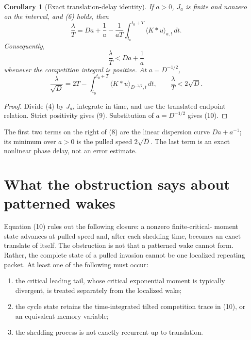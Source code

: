 \documentclass[11pt]{article}
\newtheorem{corollary}[theorem]{Corollary}
\begin{document}
\begin{corollary}[Exact translation-delay identity]\label{cor:delay}
If $a>0$, $J_a$ is finite and nonzero on the interval, and \emph{(6)} holds,
then
\begin{equation}
 \frac{\lambda}{T}
 =Da+\frac1a-\frac1{aT}
   \int_{t_0}^{t_0+T}\langle K*u\rangle_{a,t}\,dt.
\end{equation}
Consequently,
\begin{equation}
 \frac{\lambda}{T}<Da+\frac1a
\end{equation}
whenever the competition integral is positive.  At $a=D^{-1/2}$,
\begin{equation}
 \frac{\lambda}{\sqrt D}
 =2T-\int_{t_0}^{t_0+T}\langle K*u\rangle_{D^{-1/2},t}\,dt,
 \qquad \frac{\lambda}{T}<2\sqrt D.
\end{equation}
\end{corollary}

\begin{proof}
Divide (4) by $J_a$, integrate in time, and use the translated endpoint
relation.  Strict positivity gives (9).  Substitution of $a=D^{-1/2}$ gives
(10).
\end{proof}

The first two terms on the right of (8) are the linear dispersion curve
$Da+a^{-1}$; its minimum over $a>0$ is the pulled speed $2\sqrt D$.  The last
term is an exact nonlinear phase delay, not an error estimate.

\section{What the obstruction says about patterned wakes}

Equation (10) rules out the following closure: a nonzero finite-critical-
moment state advances at pulled speed and, after each shedding time, becomes
an exact translate of itself.  The obstruction is not that a patterned wake
cannot form.  Rather, the complete state of a pulled invasion cannot be one
localized repeating packet.  At least one of the following must occur:
\begin{enumerate}
  \item the critical leading tail, whose critical exponential moment is
        typically divergent, is treated separately from the localized wake;
  \item the cycle state retains the time-integrated tilted competition trace
        in (10), or an equivalent memory variable;
  \item the shedding process is not exactly recurrent up to translation.
\end{enumerate}
\end{document}
